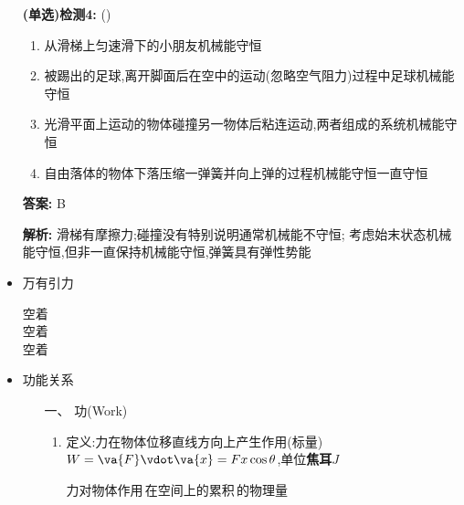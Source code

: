 \documentclass{article}
\begin{document}
\begin{itemize}
          \vspace{1em}

    \item[] \textbf{(单选)检测4:} (\qquad)

        \begin{enumerate}[label=\Alph*.]
            \item 从滑梯上匀速滑下的小朋友机械能守恒
            \item 被踢出的足球,离开脚面后在空中的运动(忽略空气阻力)过程中足球机械能守恒
            \item 光滑平面上运动的物体碰撞另一物体后粘连运动,两者组成的系统机械能守恒
            \item 自由落体的物体下落压缩一弹簧并向上弹的过程机械能守恒一直守恒
        \end{enumerate}

        \textbf{答案:} B

        \textbf{解析:} 滑梯有摩擦力;碰撞没有特别说明通常机械能不守恒;
        考虑始末状态机械能守恒,但非一直保持机械能守恒,弹簧具有弹性势能

        \hspace{2em}

    \item 万有引力

          空着    \\
          空着    \\
          空着    \\

          \hspace{2em}

    \item 功能关系
          \begin{enumerate}
              \item[一、] 功(Work)
                  \begin{enumerate}
                      \item 定义:力在物体位移直线方向上产生作用(标量)$ W = \va{F} \vdot \va{x} = Fx\cos{\theta}$,单位\textbf{焦耳$J$}

                            \vspace{-1em}

                            \hspace{-1em}\begin{adjustbox}{minipage=0.37\linewidth, bgcolor=gray!20, padding=1em}
                                \small %
                                力对物体作用\,在空间上的累积\,的物理量
                            \end{adjustbox}


\end{enumerate}
\end{enumerate}
\end{itemize}
\end{document}
